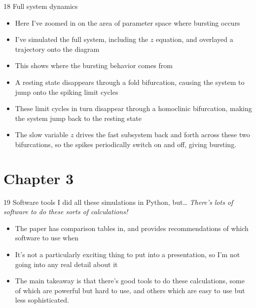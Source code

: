 \documentclass[presentation]{beamer}
\begin{document}
\begin{frame}[label={sec:org8f6d0b8}]{18 Full system dynamics}
\begin{itemize}
\item Here I've zoomed in on the area of parameter space where bursting occurs
\item I've simulated the full system, including the \(z\) equation, and overlayed a trajectory onto the diagram
\item This shows where the bursting behavior comes from
\item A resting state disappears through a fold bifurcation, causing the system to jump onto the spiking limit cycles
\item These limit cycles in turn disappear through a homoclinic bifurcation, making the system jump back to the resting state
\item The slow variable \(z\) drives the fast subsystem back and forth across these two bifurcations, so the spikes periodically switch on and off, giving bursting.
\end{itemize}
\end{frame}

\section{Chapter 3}
\label{sec:org7975561}
\begin{frame}[label={sec:org388a792}]{19 Software tools}
I did all these simulations in Python, but\ldots{}
\vfill
\emph{There's lots of software to do these sorts of calculations!}
\begin{itemize}
\item The paper has comparison tables in, and provides recommendations of which software to use when
\item It's not a particularly exciting thing to put into a presentation, so I'm not going into any real detail about it
\item The main takeaway is that there's good tools to do these calculations, some of which are powerful but hard to use, and others which are easy to use but less sophisticated.
\end{itemize}
\end{frame}
\end{document}
